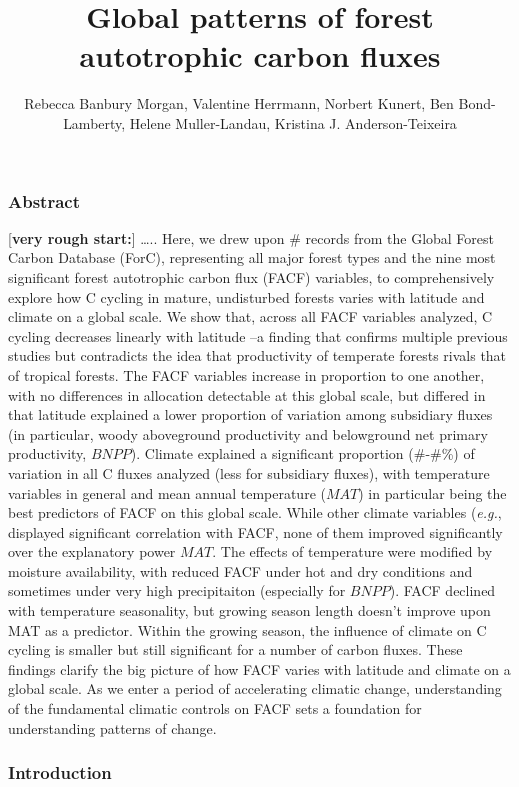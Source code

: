 \documentclass[]{article}
\title{Global patterns of forest autotrophic carbon fluxes}
\author{Rebecca Banbury Morgan, Valentine Herrmann, Norbert Kunert, Ben
Bond-Lamberty, Helene Muller-Landau, Kristina J. Anderson-Teixeira}
\date{}
\begin{document}
\maketitle

\subsubsection{Abstract}\label{abstract}

{[}\textbf{very rough start:}{]} \ldots{}.. Here, we drew upon \#
records from the Global Forest Carbon Database (ForC), representing all
major forest types and the nine most significant forest autotrophic
carbon flux (FACF) variables, to comprehensively explore how C cycling
in mature, undisturbed forests varies with latitude and climate on a
global scale. We show that, across all FACF variables analyzed, C
cycling decreases linearly with latitude --a finding that confirms
multiple previous studies but contradicts the idea that productivity of
temperate forests rivals that of tropical forests. The FACF variables
increase in proportion to one another, with no differences in allocation
detectable at this global scale, but differed in that latitude explained
a lower proportion of variation among subsidiary fluxes (in particular,
woody aboveground productivity and belowground net primary productivity,
\(BNPP\)). Climate explained a significant proportion (\#-\#\%) of
variation in all C fluxes analyzed (less for subsidiary fluxes), with
temperature variables in general and mean annual temperature (\(MAT\))
in particular being the best predictors of FACF on this global scale.
While other climate variables (\emph{e.g.}, displayed significant
correlation with FACF, none of them improved significantly over the
explanatory power \(MAT\). The effects of temperature were modified by
moisture availability, with reduced FACF under hot and dry conditions
and sometimes under very high precipitaiton (especially for \(BNPP\)).
FACF declined with temperature seasonality, but growing season length
doesn't improve upon MAT as a predictor. Within the growing season, the
influence of climate on C cycling is smaller but still significant for a
number of carbon fluxes. These findings clarify the big picture of how
FACF varies with latitude and climate on a global scale. As we enter a
period of accelerating climatic change, understanding of the fundamental
climatic controls on FACF sets a foundation for understanding patterns
of change.

\subsubsection{Introduction}\label{introduction}
\end{document}
